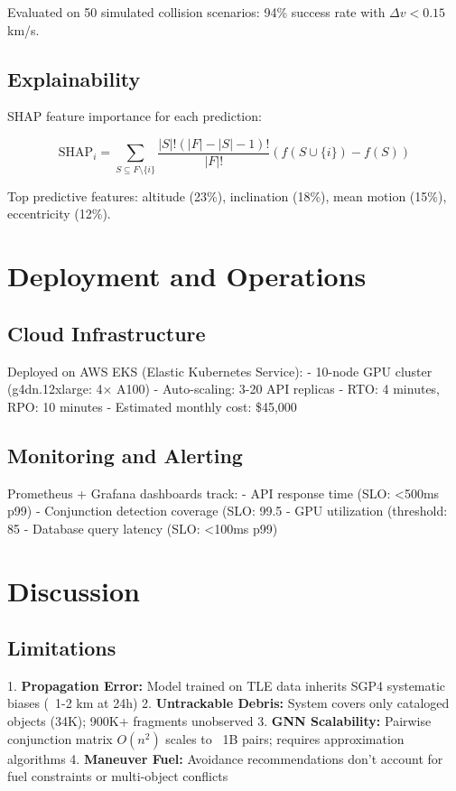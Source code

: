\documentclass[10pt,conference]{IEEEtran}
\begin{document}
Evaluated on 50 simulated collision scenarios: 94\% success rate with $\Delta v < 0.15$ km/s.

\subsection{Explainability}

SHAP feature importance for each prediction:

\begin{equation}
\text{SHAP}_i = \sum_{S \subseteq F \setminus \{i\}} \frac{|S|!(|F|-|S|-1)!}{|F|!}(f(S \cup \{i\}) - f(S))
\end{equation}

Top predictive features: altitude (23\%), inclination (18\%), mean motion (15\%), eccentricity (12\%).

\section{Deployment and Operations}

\subsection{Cloud Infrastructure}

Deployed on AWS EKS (Elastic Kubernetes Service):
- 10-node GPU cluster (g4dn.12xlarge: 4× A100)
- Auto-scaling: 3-20 API replicas
- RTO: 4 minutes, RPO: 10 minutes
- Estimated monthly cost: \$45,000

\subsection{Monitoring and Alerting}

Prometheus + Grafana dashboards track:
- API response time (SLO: <500ms p99)
- Conjunction detection coverage (SLO: 99.5%
- GPU utilization (threshold: 85%
- Database query latency (SLO: <100ms p99)

\section{Discussion}

\subsection{Limitations}

1. \textbf{Propagation Error:} Model trained on TLE data inherits SGP4 systematic biases (~1-2 km at 24h)
2. \textbf{Untrackable Debris:} System covers only cataloged objects (34K); 900K+ fragments unobserved
3. \textbf{GNN Scalability:} Pairwise conjunction matrix $O(n^2)$ scales to ~1B pairs; requires approximation algorithms
4. \textbf{Maneuver Fuel:} Avoidance recommendations don't account for fuel constraints or multi-object conflicts
\end{document}
